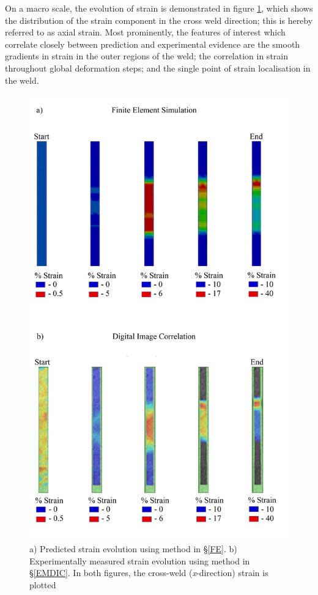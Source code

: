On a macro scale, the evolution of strain is demonstrated in figure \ref{fig:UniaxialStrainMacro}, which shows the distribution of the strain component in the cross weld direction; this is hereby referred to as axial strain. Most prominently, the features of interest which correlate closely between prediction and experimental evidence are the  smooth gradients in strain in the outer regions of the weld; the correlation in strain throughout global deformation steps; and the single point of strain localisation in the weld. 
\begin{figure}[h!]
	\centering
	\includegraphics[width=1\linewidth]{MacroStrainPredict2}		
	\caption[Mesh]{a) Predicted strain evolution using method in \S\ref{FE}. b) Experimentally measured strain evolution using method in \S\ref{EMDIC}. In both figures, the cross-weld (\textit{x}-direction) strain is plotted}
	\label{fig:UniaxialStrainMacro}	
\end{figure} 
